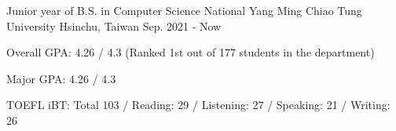

\begin{cventries}

  \cventry
    {Junior year of B.S. in Computer Science} %
    {National Yang Ming Chiao Tung University} %
    {Hsinchu, Taiwan} %
    {Sep. 2021 - Now} %
    {
      \begin{cvitems} %
        \item {Overall GPA: 4.26 / 4.3 (Ranked 1st out of 177 students in the department)}
        \item {Major GPA: 4.26 / 4.3}
        \item {TOEFL iBT: Total 103 / Reading: 29 / Listening: 27 / Speaking: 21 / Writing: 26}
      \end{cvitems}
    }

\end{cventries}


    
    
    

